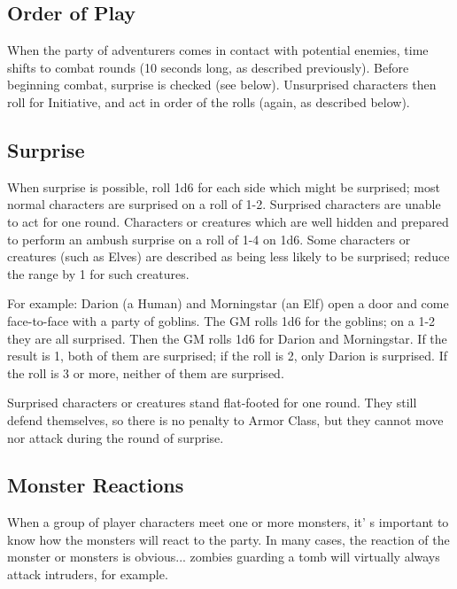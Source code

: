 \documentclass[a4paper,twoside,openany,10pt]{book}
\begin{document}
\begin{multicols}{2}

\subsection{Order of Play}\label{order-of-play}

When the party of adventurers comes in contact with potential enemies, time shifts to combat rounds (10 seconds long, as described previously). Before beginning combat, surprise is checked (see below). Unsurprised characters then roll for Initiative, and act in order of the rolls (again, as described below).

\subsection{Surprise}\label{surprise}

When surprise is possible, roll 1d6 for each side which might be surprised; most normal characters are surprised on a roll of 1-2. Surprised characters are unable to act for one round. Characters or creatures which are well hidden and prepared to perform an ambush surprise on a roll of 1-4 on 1d6. Some characters or creatures (such as Elves) are described as being less likely to be surprised; reduce the range by 1 for such creatures.

For example: Darion (a Human) and Morningstar (an Elf) open a door and come face-to-face with a party of goblins. The GM rolls 1d6 for the goblins; on a 1-2 they are all surprised. Then the GM rolls 1d6 for Darion and Morningstar. If the result is 1, both of them are surprised; if the roll is 2, only Darion is surprised. If the roll is 3 or more, neither of them are surprised.

Surprised characters or creatures stand flat-footed for one round. They still defend themselves, so there is no penalty to Armor Class, but they cannot move nor attack during the round of surprise. 

\subsection{Monster Reactions}\label{monster-reactions}

When a group of player characters meet one or more monsters, it' s important to know how the monsters will react to the party. In many cases, the reaction of the monster or monsters is obvious... zombies guarding a tomb will virtually always attack intruders, for example. 


\end{multicols}
\end{document}
